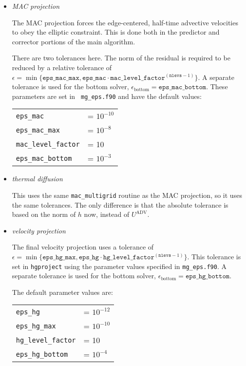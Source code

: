 \begin{itemize}

\item {\em MAC projection}  

  The MAC projection forces the edge-centered, half-time advective
  velocities to obey the elliptic constraint.  This is done both in
  the predictor and corrector portions of the main algorithm.

  There are two tolerances here.  The norm of the residual is required
  to be reduced by a relative tolerance of $\epsilon =
  \min \{ \mathtt{eps\_mac\_max}, \mathtt{eps\_mac} \cdot
  \mathtt{mac\_level\_factor}^{(\mathtt{nlevs}-1)} \}$. A separate
  tolerance is used for the bottom
  solver, $\epsilon_\mathrm{bottom} =
  \mathtt{eps\_mac\_bottom}$.  These parameters are set in {\tt
    mg\_eps.f90} and have the default values:
   \begin{center}
   \begin{tabular}{ll}
   {\tt eps\_mac}           &= $10^{-10}$ \\
   {\tt eps\_mac\_max}           &= $10^{-8}$ \\
   {\tt mac\_level\_factor} &= 10 \\
   {\tt eps\_mac\_bottom}   &= $10^{-3}$
   \end{tabular}
   \end{center}



\item {\em thermal diffusion}

  This uses the same {\tt mac\_multigrid} routine as the MAC
  projection, so it uses the same tolerances.  The only difference is
  that the absolute tolerance is based on the norm of $h$ now, instead
  of $U^\mathrm{ADV}$.

\item {\em velocity projection}

  The final velocity projection uses a tolerance of $\epsilon = \min \{
  \mathtt{eps\_hg\_max}, \mathtt{eps\_hg} \cdot \mathtt{hg\_level\_factor}^{(\mathtt{nlevs} - 1)} \}$.  This tolerance
  is set in {\tt hgproject} using the parameter values specified in {\tt mg\_eps.f90}.  A separate
  tolerance is used for the bottom
  solver, $\epsilon_\mathrm{bottom} = \mathtt{eps\_hg\_bottom}$.


  The default parameter values are:
   \begin{center}
   \begin{tabular}{ll}
   {\tt eps\_hg}     &= $10^{-12}$ \\
   {\tt eps\_hg\_max}      &= $10^{-10}$ \\
   {\tt hg\_level\_factor}  &= 10 \\
   {\tt eps\_hg\_bottom}   &= $10^{-4}$
   \end{tabular}
   \end{center}

\end{itemize}


